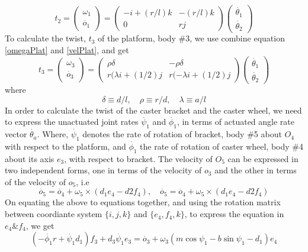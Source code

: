 \begin{equation}
\label{twist2}
t_2=\begin{pmatrix}
\omega_1\\\dot{o_1}
\end{pmatrix}=
\begin{pmatrix}
-i+(r/l)k & -(r/l)k\\  0 &rj
\end{pmatrix}
\begin{pmatrix}
\dot{\theta_1}\\\dot{\theta_2}
\end{pmatrix}
\end{equation}
To calculate the twist, $t_3$ of the platform, body \#3, we use combine equation \ref{omegaPlat} and \ref{velPlat}, and get
\begin{equation}
\label{twist3}
t_3=\begin{pmatrix}
\omega_3\\\dot{o_3}
\end{pmatrix}=
\begin{pmatrix}
\rho\delta & -\rho\delta\\
r(\lambda i+(1/2)j & r(-\lambda i+(1/2)j
\end{pmatrix}
\begin{pmatrix}
\dot{\theta_1}\\\dot{\theta_2}
\end{pmatrix}
\end{equation}
where
\[ \delta\equiv d/l, \quad \rho \equiv r/d, \quad \lambda \equiv a/l \]
In order to calculate the twist of the caster bracket and the caster wheel, we need to express the  unactuated joint rates $\dot{\psi_1}$ and $\dot{\phi_1}$, in terms of actuated angle rate vector $\dot{\theta_a}$. Where, $\dot{\psi_1}$ denotes the rate of rotation of bracket, body \#5 about $O_4$ with respect to the platform, and 
$\dot{\phi_1}$ the rate of rotation of caster wheel, body \#4 about its axis $e_3$, with respect to bracket. The velocity of $O_5$ can be expressed in two independent forms, one in terms of the velocity of $o_3$ and the other in terms of the velocity of $o_5$, i.e
\begin{equation}
\dot{o_5}=\dot{o_4}+\omega_5\times(d_1e_4-d2f_4), \quad
\dot{o_5}=\dot{o_4}+\omega_5\times(d_1e_4-d2f_4)
\end{equation}
On equating the above to equations together, and using the rotation matrix between coordiante system $\{i,j,k\}$ and $\{e_4,f_4,k\}$, to express the equation in $e_4\&f_4$, we get
\begin{equation}
(-\dot{\phi_1}r+\dot{\psi_1}d_1)f_3+d_3\dot{\psi_1}e_3=\dot{o_3}
+\omega_3(m\cos\psi_1-b\sin\psi_1-d_1)e_4
\end{equation} 
